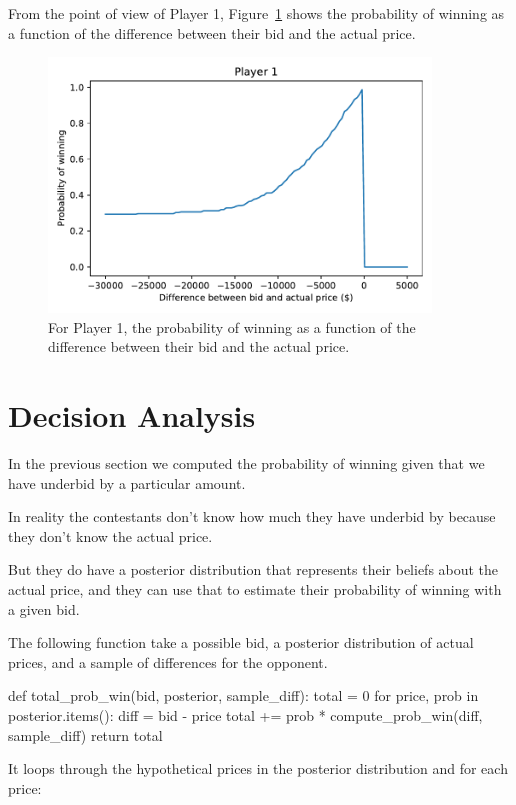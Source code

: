 \documentclass[12pt]{book}
\theoremstyle{exercise}
\begin{document}
From the point of view of Player 1, Figure~\ref{fig08-04} shows the probability of winning as a function of the difference between their bid and the actual price.

\begin{figure}
\centerline{\includegraphics[width=4in]{figs/fig08-04.pdf}}
\caption{For Player 1, the probability of winning as a function of the difference between their bid and the actual price.}
\label{fig08-04}
\end{figure}


\section{Decision Analysis}

In the previous section we computed the probability of winning given that we have underbid by a particular amount.

In reality the contestants don't know how much they have underbid by because they don't know the actual price.

But they do have a posterior distribution that represents their beliefs about the actual price, and they can use that to estimate their probability of winning with a given bid.

The following function take a possible bid, a posterior distribution of actual prices, and a sample of differences for the opponent.

\begin{code}
def total_prob_win(bid, posterior, sample_diff):
    total = 0
    for price, prob in posterior.items():
        diff = bid - price
        total += prob * compute_prob_win(diff, sample_diff)
    return total
\end{code}

It loops through the hypothetical prices in the posterior distribution and for each price:
\end{document}
